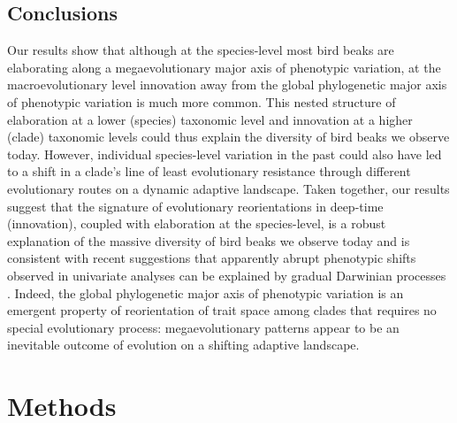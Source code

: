\documentclass[12pt,letterpaper]{article}
\begin{document}
\subsection{Conclusions}

Our results show that although at the species-level most bird beaks are elaborating along a megaevolutionary major axis of phenotypic variation, at the macroevolutionary level innovation away from the global phylogenetic major axis of phenotypic variation is much more common. 
This nested structure of elaboration at a lower (species) taxonomic level and innovation at a higher (clade) taxonomic levels could thus explain the diversity of bird beaks we observe today.
However, individual species-level variation in the past could also have led to a shift in a clade's line of least evolutionary resistance through different evolutionary routes on a dynamic adaptive landscape. 
Taken together, our results suggest that the signature of evolutionary reorientations in deep-time (innovation), coupled with elaboration at the species-level, is a robust explanation of the massive diversity of bird beaks we observe today and is consistent with recent suggestions that apparently abrupt phenotypic shifts observed in univariate analyses can be explained by gradual Darwinian processes \cite{pagel2022general, BurinWhales,goswami2022}.
Indeed, the global phylogenetic major axis of phenotypic variation is an emergent property of reorientation of trait space among clades that requires no special evolutionary process: megaevolutionary patterns appear to be an inevitable outcome of evolution on a shifting adaptive landscape. 



\section{Methods}
\end{document}

